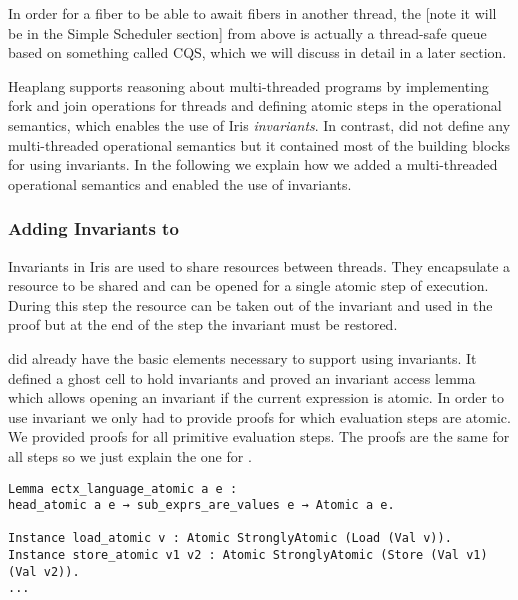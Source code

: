 In order for a fiber to be able to await fibers in another thread, the  [note it will be in the Simple Scheduler section] from above is actually a thread-safe queue based on something called CQS, which we will discuss in detail in a later section.

Heaplang supports reasoning about multi-threaded programs by implementing fork and join operations for threads and defining atomic steps in the operational semantics, which enables the use of Iris \textit{invariants}.
In contrast, \hazel{} did not define any multi-threaded operational semantics but it contained most of the building blocks for using invariants.
In the following we explain how we added a multi-threaded operational semantics and enabled the use of invariants.


\subsubsection*{Adding Invariants to \hazel{}}

Invariants in Iris are used to share resources between threads.
They encapsulate a resource to be shared and can be opened for a single atomic step of execution.
During this step the resource can be taken out of the invariant and used in the proof but at the end of the step the invariant must be restored.

\hazel{} did already have the basic elements necessary to support using invariants.
It defined a ghost cell to hold invariants and proved an invariant access lemma which allows opening an invariant if the current expression is atomic.
In order to use invariant we only had to provide proofs for which evaluation steps are atomic.
We provided proofs for all primitive evaluation steps.
The proofs are the same for all steps so we just explain the one for .

\begin{verbatim}
Lemma ectx_language_atomic a e :
head_atomic a e → sub_exprs_are_values e → Atomic a e.

Instance load_atomic v : Atomic StronglyAtomic (Load (Val v)).
Instance store_atomic v1 v2 : Atomic StronglyAtomic (Store (Val v1) (Val v2)).
...
\end{verbatim}

